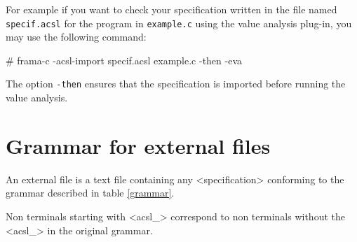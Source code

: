\documentclass{frama-c-book}
\begin{document}
For example if you want to check your specification written in the file
named \verb|specif.acsl| for the program in \verb|example.c| using the
value analysis plug-in\cite{value}, you may use the following command:
\begin{shell}
# frama-c -acsl-import specif.acsl example.c -then -eva
\end{shell}
The option \verb|-then| ensures that the specification is imported
before running the value analysis.

\section*{Grammar for external \acsl files}
\markright{}

An external \acsl file is a text file containing any <specification> conforming to the grammar described in table \ref{grammar}.

Non terminals starting with <acsl\_> correspond to non terminals without the <acsl\_> in the original \acsl grammar\cite{acsl}.
\end{document}

